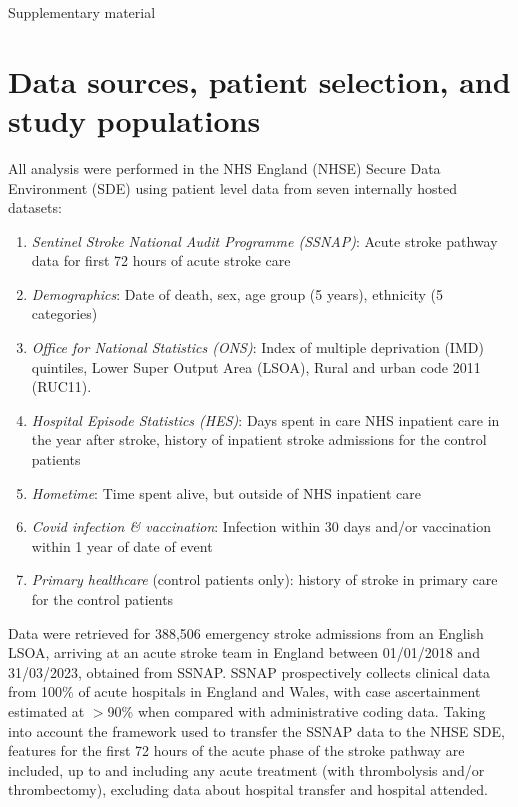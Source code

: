 \begin{center} {\huge Supplementary material} \end{center}


\section{Data sources, patient selection, and study populations}

All analysis were performed in the NHS England (NHSE) Secure Data Environment (SDE) using patient level data from seven internally hosted datasets:

\begin{enumerate}
    \item \textit{Sentinel Stroke National Audit Programme (SSNAP)}: Acute stroke pathway data for first 72 hours of acute stroke care
    \item \textit{Demographics}: Date of death, sex, age group (5 years), ethnicity (5 categories)
    \item \textit{Office for National Statistics (ONS)}: Index of multiple deprivation (IMD) quintiles, Lower Super Output Area (LSOA), Rural and urban code 2011 (RUC11).
    \item \textit{Hospital Episode Statistics (HES)}: Days spent in care NHS inpatient care in the year after stroke, history of inpatient stroke admissions for the control patients
    \item \textit{Hometime}: Time spent alive, but outside of NHS inpatient care
    \item \textit{Covid infection \& vaccination}: Infection within 30 days and/or vaccination within 1 year of date of event
    \item \textit{Primary healthcare} (control patients only): history of stroke in primary care for the control patients
\end{enumerate} 

Data were retrieved for 388,506 emergency stroke admissions from an English LSOA, arriving at an acute stroke team in England between 01/01/2018 and 31/03/2023, obtained from SSNAP. SSNAP prospectively collects clinical data from 100\% of acute hospitals in England and Wales, with case ascertainment estimated at $>$90\% when compared with administrative coding data. Taking into account the framework used to transfer the SSNAP data to the NHSE SDE, features for the first 72 hours of the acute phase of the stroke pathway are included, up to and including any acute treatment (with thrombolysis and/or thrombectomy), excluding data about hospital transfer and hospital attended.

